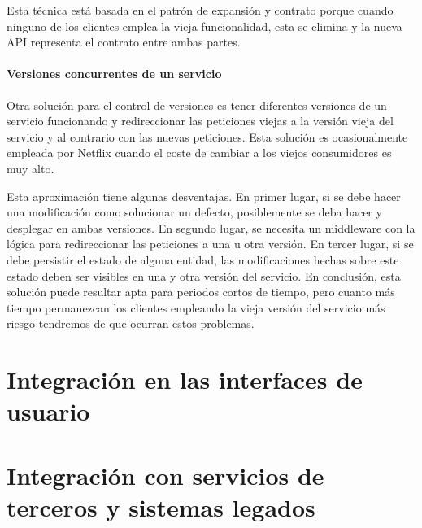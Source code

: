 \documentclass[11pt,a4paper]{article}
\begin{document}
Esta técnica está basada en el patrón de expansión y contrato porque cuando ninguno de los clientes emplea la vieja funcionalidad, esta se elimina y la nueva API representa el contrato entre ambas partes.

\subsection{Versiones concurrentes de un servicio}

Otra solución para el control de versiones es tener diferentes versiones de un servicio funcionando y redireccionar las peticiones viejas a la versión vieja del servicio y al contrario con las nuevas peticiones. Esta solución es ocasionalmente empleada por Netflix cuando el coste de cambiar a los viejos consumidores es muy alto.

Esta aproximación tiene algunas desventajas. En primer lugar, si se debe hacer una modificación como solucionar un defecto, posiblemente se deba hacer y desplegar en ambas versiones. En segundo lugar, se necesita un middleware con la lógica para redireccionar las peticiones a una u otra versión. En tercer lugar, si se debe persistir el estado de alguna entidad, las modificaciones hechas sobre este estado deben ser visibles en una y otra versión del servicio. En conclusión, esta solución puede resultar apta para periodos cortos de tiempo, pero cuanto más tiempo permanezcan los clientes empleando la vieja versión del servicio más riesgo tendremos de que ocurran estos problemas.

\part{Integración en las interfaces de usuario}

\part{Integración con servicios de terceros y sistemas legados}
\end{document}
